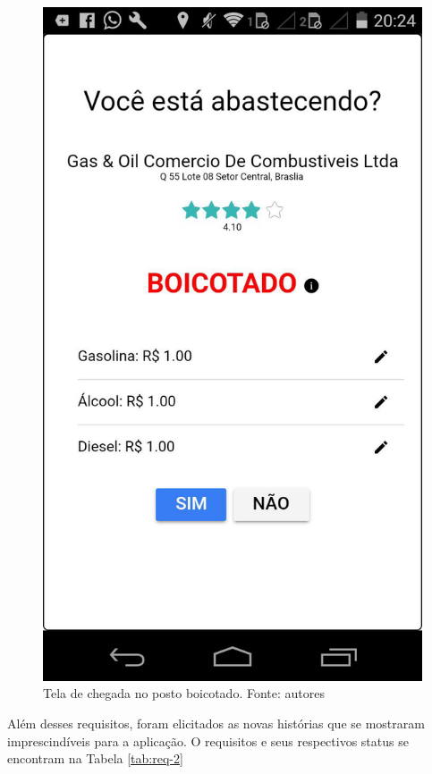 \begin{figure}[H]
    \centering
    \includegraphics[scale=0.2]{figuras/chegou-posto.jpg}
    \caption[Tela de chegada no posto boicotado]{Tela de chegada no posto boicotado. Fonte: autores}
    \label{img:chegou-posto-boicotado}
\end{figure}

Além desses requisitos, foram elicitados as novas histórias que se mostraram imprescindíveis para a aplicação. O requisitos e seus respectivos status se encontram na Tabela \ref{tab:req-2}

